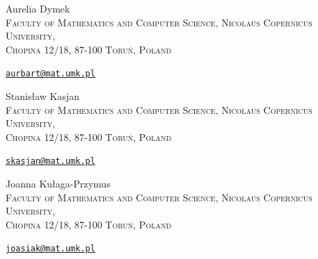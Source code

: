 \documentclass[leqno,a4paper,12pt]{article}
\theoremstyle{definition}
\newtheorem{Remark}[Th]{Remark}
\begin{document}


        \bigskip
        \footnotesize

		\noindent
		Aurelia Dymek\\
 \textsc{Faculty of Mathematics and Computer Science, Nicolaus Copernicus University,\\ Chopina 12/18, 87-100 Toru\'{n}, Poland}\par\nopagebreak
        \noindent
        \href{mailto:aurbart@mat.umk.pl}
        {\texttt{aurbart@mat.umk.pl}}

\medskip

		\noindent
		Stanis\l aw Kasjan\\
        \textsc{Faculty of Mathematics and Computer Science, Nicolaus Copernicus University,\\ Chopina 12/18, 87-100 Toru\'{n}, Poland}\par\nopagebreak
        \noindent
        \href{mailto:skasjan@mat.umk.pl}
        {\texttt{skasjan@mat.umk.pl}}
				
        
\medskip        
        
        \noindent       
        Joanna Ku\l aga-Przymus\\
        \textsc{Faculty of Mathematics and Computer Science, Nicolaus Copernicus University,\\ Chopina 12/18, 87-100 Toru\'{n}, Poland}\par\nopagebreak
        \noindent
        \href{mailto:joasiak@mat.umk.pl}
        {\texttt{joasiak@mat.umk.pl}}
\end{document}
